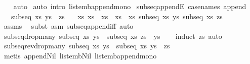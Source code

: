 \begin{isabellebody}
\ \ \isamarkupfalse%
\ auto\isanewline
{}\isamarkupfalse%
\ {\isacharparenleft}auto\ intro{\isacharcolon}\ list{\isacharunderscore}emb{\isacharunderscore}append{\isacharunderscore}mono{\isacharparenright}%
\endisatagproof
{\isafoldproof}%
%
\isadelimproof
\isanewline
%
\endisadelimproof
\isanewline
{}\isamarkupfalse%
\ subseq{\isacharunderscore}appendE\ {\isacharbrackleft}case{\isacharunderscore}names\ append{\isacharbrackright}{\isacharcolon}\ \isanewline
\ \ \ {\isachardoublequoteopen}subseq\ xs\ {\isacharparenleft}ys\ {\isacharat}\ zs{\isacharparenright}{\isachardoublequoteclose}\isanewline
\ \ \ xs{}\ xs{}\ \ {\isachardoublequoteopen}xs\ {\isacharequal}\ xs{}\ {\isacharat}\ xs{}{\isachardoublequoteclose}\ {\isachardoublequoteopen}subseq\ xs{}\ ys{\isachardoublequoteclose}\ {\isachardoublequoteopen}subseq\ xs{}\ zs{\isachardoublequoteclose}\isanewline
%
\isadelimproof
\ \ %
\endisadelimproof
%
\isatagproof
{}\isamarkupfalse%
\ assms\ \isamarkupfalse%
\ {\isacharparenleft}subst\ {\isacharparenleft}asm{\isacharparenright}\ subseq{\isacharunderscore}append{\isacharunderscore}iff{\isacharparenright}\ auto%
\endisatagproof
{\isafoldproof}%
%
\isadelimproof
\isanewline
%
\endisadelimproof
\isanewline
{}\isamarkupfalse%
\ subseq{\isacharunderscore}drop{\isacharunderscore}many{\isacharcolon}\ {\isachardoublequoteopen}subseq\ xs\ ys\ {\isasymLongrightarrow}\ subseq\ xs\ {\isacharparenleft}zs\ {\isacharat}\ ys{\isacharparenright}{\isachardoublequoteclose}\isanewline
%
\isadelimproof
\ \ %
\endisadelimproof
%
\isatagproof
{}\isamarkupfalse%
\ {\isacharparenleft}induct\ zs{\isacharparenright}\ auto%
\endisatagproof
{\isafoldproof}%
%
\isadelimproof
\isanewline
%
\endisadelimproof
\isanewline
{}\isamarkupfalse%
\ subseq{\isacharunderscore}rev{\isacharunderscore}drop{\isacharunderscore}many{\isacharcolon}\ {\isachardoublequoteopen}subseq\ xs\ ys\ {\isasymLongrightarrow}\ subseq\ xs\ {\isacharparenleft}ys\ {\isacharat}\ zs{\isacharparenright}{\isachardoublequoteclose}\isanewline
%
\isadelimproof
\ \ %
\endisadelimproof
%
\isatagproof
{}\isamarkupfalse%
\ {\isacharparenleft}metis\ append{\isacharunderscore}Nil{}\ list{\isacharunderscore}emb{\isacharunderscore}Nil\ list{\isacharunderscore}emb{\isacharunderscore}append{\isacharunderscore}mono{\isacharparenright}%
\endisatagproof
{\isafoldproof}%
%

\end{isabellebody}
